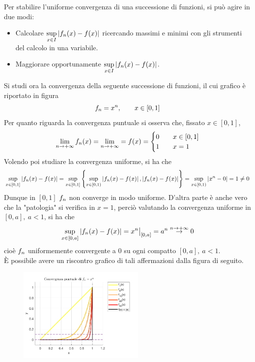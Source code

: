 \begin{oss}
 Per stabilire l'uniforme convergenza di una successione di funzioni, si può agire in due modi:
    \begin{itemize}
       \item Calcolare $\sup\limits_{x \in I} |f_n(x)-f(x)|$ ricercando massimi e minimi con gli strumenti del calcolo in una variabile.
       \item Maggiorare opportunamente $\sup\limits_{x \in I} |f_n(x)-f(x)|$.
\end{itemize}
\end{oss}
\begin{example}
Si studi ora la convergenza della seguente successione di funzioni, il cui grafico è riportato in figura
\begin{equation*}
    f_n= x^n, \qquad x \in [0,1]
\end{equation*}
Per quanto riguarda la convergenza puntuale si osserva che, fissato $x \in [0,1]$,
\begin{equation*}
    \lim_{n \to +\infty}{f_n(x)}= \lim_{n \to + \infty}= f(x) = \begin{cases}
        0 &\quad x \in [0,1]\\
        1 &\quad x=1
    \end{cases}
\end{equation*}
Volendo poi studiare la convergenza uniforme, si ha che
\begin{equation*}
    \sup_{x \in [0,1]}{\left|f_n(x)-f(x)\right|} = \sup_{x \in [0,1]} \left\{ \sup_{x \in [0,1)} \left|f_n(x)-f(x)\right|, \left|f_n(x)-f(x)\right|\right\} = \sup_{x \in [0,1)}{\left|x^n-0\right|} = 1 \neq 0
\end{equation*}
Dunque in $[0,1]$ $f_n$ non converge in modo uniforme. D'altra parte è anche vero che la "patologia" si verifica in $x=1$, perciò valutando la convergenza uniforme in $[0,a],\ a < 1$, si ha che
\begin{equation*}
    \sup_{x \in [0,a]}{|f_n(x)-f(x)|}= x^n \big|_{[0,a]} = a^n \overset{n \to +\infty}{\to} 0
\end{equation*}
cioè $f_n$ uniformemente convergente a $0$ su ogni compatto $[0,a],\ a<1$.\\
È possibile avere un riscontro grafico di tali affermazioni dalla figura di seguito.
\begin{figure}[H]
    \centering
\includegraphics[width=0.55\textwidth]{Capitoli/Capitolo7/Convergenza puntuale.png}
    \end{figure}
\end{example}
